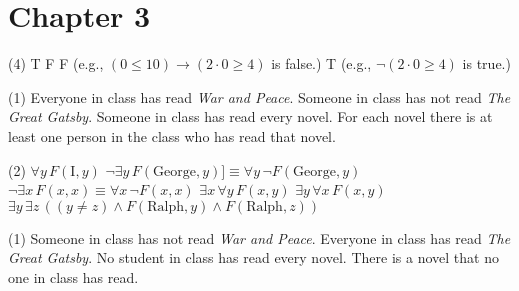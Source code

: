    \section*{Chapter 3}
\begin{Solution}{3.1}
\quad
    \begin{tasks}(4)
        \task T
        \task* F
        \task* F  (e.g., $(0\leq 10) \to (2\cdot0\geq 4)$ is false.)
        \task* T  (e.g., $\lnot (2\cdot 0 \geq 4)$ is true.)
    \end{tasks}
\end{Solution}
\begin{Solution}{3.2}
\quad
    \begin{tasks}(1)
\task Everyone in class has read \textit{War and Peace}.
\task Someone in class has not read \textit{The Great Gatsby}.
\task Someone in class has read every novel.
\task For each novel there is at least one person in the class who has read that novel.
    \end{tasks}
\end{Solution}
\begin{Solution}{3.3}
\quad
	\begin{tasks}(2)
		\task* $\forall y \, F(\text{I},y)$
		\task* $\lnot\exists y \, F(\text{George},y)] \equiv  \forall y \, \lnot F(\text{George},y)$
		\task* $\lnot \exists x \, F(x,x) \equiv \forall x \, \neg F(x,x)$
		\task $\exists x \, \forall y \,F(x,y)$
		\task $\exists y \, \forall x \, F(x,y)$
		\task* $\exists y \, \exists z \, ((y\not= z) \land F(\text{Ralph},y)\land F(\text{Ralph},z))$
	\end{tasks}
\end{Solution}
\begin{Solution}{3.4}
\quad
	\begin{tasks}(1)
		\task Someone in class has not read \textit{War and Peace}.
		\task Everyone in class has read \textit{The Great Gatsby}.
		\task No student in class has read every novel.
		\task There is a novel that no one in class has read.
	\end{tasks}
\end{Solution}

